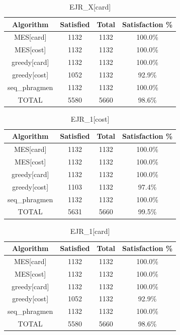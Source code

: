 \begin{table}[h]
\centering
\begin{tabular}{cccc}
\toprule
Algorithm & Satisfied & Total & Satisfaction \% \\
\midrule
MES[card] & 1132 & 1132 & 100.0\% \\
MES[cost] & 1132 & 1132 & 100.0\% \\
greedy[card] & 1132 & 1132 & 100.0\% \\
greedy[cost] & 1052 & 1132 & 92.9\% \\
seq\_phragmen & 1132 & 1132 & 100.0\% \\
TOTAL & 5580 & 5660 & 98.6\% \\
\bottomrule
\end{tabular}
\caption{EJR\_X[card]}
\end{table}


\begin{table}[h]
\centering
\begin{tabular}{cccc}
\toprule
Algorithm & Satisfied & Total & Satisfaction \% \\
\midrule
MES[card] & 1132 & 1132 & 100.0\% \\
MES[cost] & 1132 & 1132 & 100.0\% \\
greedy[card] & 1132 & 1132 & 100.0\% \\
greedy[cost] & 1103 & 1132 & 97.4\% \\
seq\_phragmen & 1132 & 1132 & 100.0\% \\
TOTAL & 5631 & 5660 & 99.5\% \\
\bottomrule
\end{tabular}
\caption{EJR\_1[cost]}
\end{table}


\begin{table}[h]
\centering
\begin{tabular}{cccc}
\toprule
Algorithm & Satisfied & Total & Satisfaction \% \\
\midrule
MES[card] & 1132 & 1132 & 100.0\% \\
MES[cost] & 1132 & 1132 & 100.0\% \\
greedy[card] & 1132 & 1132 & 100.0\% \\
greedy[cost] & 1052 & 1132 & 92.9\% \\
seq\_phragmen & 1132 & 1132 & 100.0\% \\
TOTAL & 5580 & 5660 & 98.6\% \\
\bottomrule
\end{tabular}
\caption{EJR\_1[card]}
\end{table}
